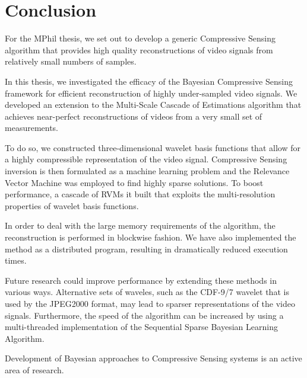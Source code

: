 \chapter{Conclusion}
\label{ch:conclusion}

For the MPhil thesis, we set out to develop a generic Compressive Sensing algorithm that provides high quality reconstructions of video signals from relatively small numbers of samples.


In this thesis, we investigated the efficacy of the Bayesian Compressive Sensing framework for efficient reconstruction of highly under-sampled video signals.
We developed an extension to the Multi-Scale Cascade of Estimations algorithm that achieves near-perfect reconstructions of videos from a very small set of measurements.

To do so, we constructed three-dimensional wavelet basis functions that allow for a highly compressible representation of the video signal.
Compressive Sensing inversion is then formulated as a machine learning problem and the Relevance Vector Machine was employed to find highly sparse solutions.
To boost performance, a cascade of RVMs it built that exploits the multi-resolution properties of wavelet basis functions.

In order to deal with the large memory requirements of the algorithm, the reconstruction is performed in blockwise fashion.
We have also implemented the method as a distributed program, resulting in dramatically reduced execution times.

Future research could improve performance by extending these methods in various ways.
Alternative sets of waveles, such as the CDF-9/7 wavelet that is used by the JPEG2000 format, may lead to sparser representations of the video signals. 
Furthermore, the speed of the algorithm can be increased by using a multi-threaded implementation of the Sequential Sparse Bayesian Learning Algorithm. 

Development of Bayesian approaches to Compressive Sensing systems is an active area of research.

